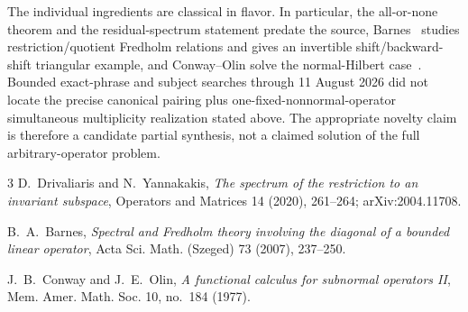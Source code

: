 \documentclass[11pt]{article}
\begin{document}
The individual ingredients are classical in flavor.  In particular, the
all-or-none theorem and the residual-spectrum statement predate the source,
Barnes~\cite{barnes} studies restriction/quotient Fredholm relations and gives
an invertible shift/backward-shift triangular example, and Conway--Olin solve
the normal-Hilbert case~\cite{conwayolin}.  Bounded exact-phrase and subject
searches through 11 August 2026 did not locate the precise canonical pairing
plus one-fixed-nonnormal-operator simultaneous multiplicity realization stated
above.  The appropriate novelty claim is therefore a candidate partial
synthesis, not a claimed solution of the full arbitrary-operator problem.

\begin{thebibliography}{3}
D.~Drivaliaris and N.~Yannakakis,
\emph{The spectrum of the restriction to an invariant subspace},
Operators and Matrices 14 (2020), 261--264; arXiv:2004.11708.

B.~A.~Barnes,
\emph{Spectral and Fredholm theory involving the diagonal of a bounded linear operator},
Acta Sci. Math. (Szeged) 73 (2007), 237--250.

J.~B.~Conway and J.~E.~Olin,
\emph{A functional calculus for subnormal operators II},
Mem. Amer. Math. Soc. 10, no.~184 (1977).
\end{thebibliography}
\end{document}
